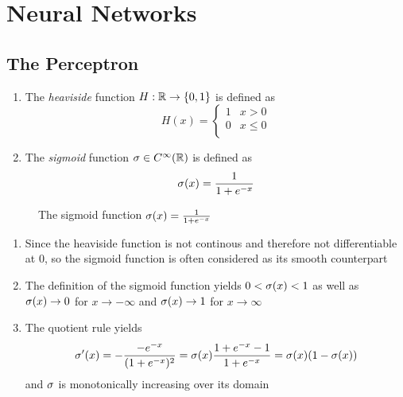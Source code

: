 \newpage
\section{Neural Networks}

\subsection{The Perceptron}

\begin{definition}\hfill
    \begin{enumerate}
		\item The \emph{heaviside} function \( H: \mathbb{R} \to \{ 0, 1 \} \) is defined as
			\[
				H(x) = \left\{
					\begin{array}{ll}
						1 & x > 0 \\
						0 & x \le 0 \\
					\end{array} 
				\right.
			\]
		\item The \emph{sigmoid} function \( \sigma \in C^\infty(\mathbb{R}) \) is defined as 
			\[
				\sigma(x) = \frac{1}{1 + e^{-x}}
			\]
    \end{enumerate}
\end{definition}
\bigskip


\begin{figure}[H]
	\centering
	\plotsigmoid
	\caption{The sigmoid function $ \sigma(x) = \frac{1}{1 + e^{-x}} $}\label{fig:sigmoid}
\end{figure}
\bigskip


\begin{remarks}\hfill
    \begin{enumerate}
		\item Since the heaviside function is not continous and therefore not differentiable at \( 0 \), 
			so the sigmoid function is often considered as its smooth counterpart
		\item The definition of the sigmoid function yields \( 0 < \sigma(x) <  1 \) as well as 
			\( \sigma(x) \to 0 \) for \( x \to -\infty \) and \( \sigma(x) \to 1 \) for \( x \to \infty \)
		\item The quotient rule yields
			\[
				\sigma'(x) 
					= -\frac{-e^{-x}}{(1 + e^{-x})^2}
					= \sigma(x) \frac{1 + e^{-x} - 1}{1 + e^{-x}}
					= \sigma(x)(1 - \sigma(x))
			\]
			and \( \sigma \) is monotonically increasing over its domain
    \end{enumerate}
\end{remarks}
\bigskip


